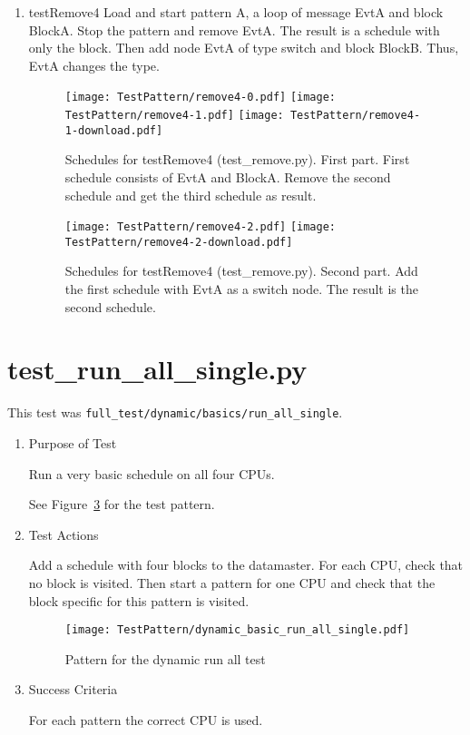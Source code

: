 \documentclass[12pt,a4paper]{report}
\begin{document}
\begin{enumerate}
\item testRemove4
    Load and start pattern A, a loop of message EvtA and block BlockA.
    Stop the pattern and remove EvtA. The result is a schedule with only
    the block. Then add node EvtA of type switch and block BlockB. Thus,
    EvtA changes the type.
    \begin{figure}
        \centering
        \texttt{[image: TestPattern/remove4-0.pdf]}
        \texttt{[image: TestPattern/remove4-1.pdf]}
        \texttt{[image: TestPattern/remove4-1-download.pdf]}
        \caption{Schedules for testRemove4 (test\_remove.py). First part.
        First schedule consists of EvtA and BlockA. Remove the second schedule and get
        the third schedule as result.}
        \label{fig:Schedules_for_testRemove4-1}
    \end{figure}
    \begin{figure}
        \centering
        \texttt{[image: TestPattern/remove4-2.pdf]}
        \texttt{[image: TestPattern/remove4-2-download.pdf]}
        \caption{Schedules for testRemove4 (test\_remove.py). Second part.
        Add the first schedule with EvtA as a switch node. The result
        is the second schedule.}
        \label{fig:Schedules_for_testRemove4-2}
    \end{figure}

\end{enumerate}

\section{test\_run\_all\_single.py}
This test was \texttt{full\_test/dynamic/basics/run\_all\_single}.
\begin{enumerate}
  \item Purpose of Test

    Run a very basic schedule on all four CPUs.

  See Figure~\ref{fig:Pattern_for_the_dynamic_run_all_test} for the test pattern.
  \item Test Actions

  Add a schedule with four blocks to the datamaster. For each CPU,
  check that no block is visited. Then start a pattern for one CPU and
  check that the block specific for this pattern is visited.
    \begin{figure}
        \centering
        \texttt{[image: TestPattern/dynamic\_basic\_run\_all\_single.pdf]}
        \caption{Pattern for the dynamic run all test}
        \label{fig:Pattern_for_the_dynamic_run_all_test}
    \end{figure}
  \item Success Criteria

  For each pattern the correct CPU is used.
\end{enumerate}
\end{document}
